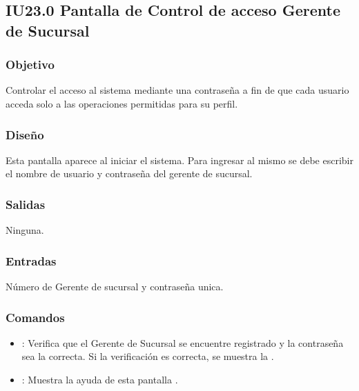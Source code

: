 
\subsection{IU23.0 Pantalla de Control de acceso Gerente de Sucursal}

\subsubsection{Objetivo}
	Controlar el acceso al sistema mediante una contraseña a fin de que cada usuario acceda solo a las operaciones permitidas para su perfil.

\subsubsection{Diseño}
	Esta pantalla aparece al iniciar el sistema. Para ingresar al mismo se debe escribir el nombre de usuario y contraseña del gerente de sucursal. 


\subsubsection{Salidas}

	Ninguna.

\subsubsection{Entradas}
Número de Gerente de sucursal y contraseña unica.

\subsubsection{Comandos}
\begin{itemize}
	\item {}: Verifica que el Gerente de Sucursal se encuentre registrado y la contraseña sea la correcta. Si la verificación es correcta, se muestra la .
	\item {}: Muestra la ayuda de esta pantalla .
\end{itemize}

